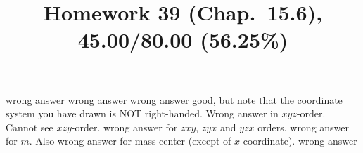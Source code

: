 \documentclass[pstricks,10pt,dvipsnames]{article} %
\title{Homework 39 (Chap.~15.6),
45.00/80.00 (56.25\%)
}
\begin{document}
\maketitle
{}
wrong answer
wrong answer
wrong answer
good, but note that the coordinate system you have drawn is NOT right-handed.
Wrong answer in $xyz$-order. Cannot see $xzy$-order.
wrong answer for $zxy$, $zyx$ and $yzx$ orders.
wrong answer for $m$. Also wrong answer for mass center (except of $x$ coordinate). 
wrong answer
\end{document}
